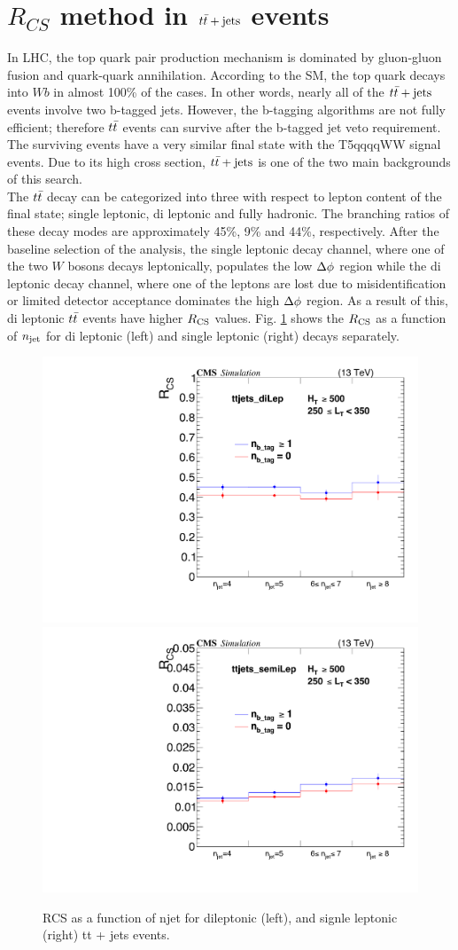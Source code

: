 \section{$R_{CS}$ method in $t\bar{t}+\textrm{jets}$ events}
\label{sec:RcsTT}
In LHC, the top quark pair production mechanism is dominated by gluon-gluon fusion and quark-quark annihilation. According to the SM, the top quark decays into $Wb$ in almost 100\% of the cases.  In other words, nearly all of the $t\bar{t}+\textrm{jets}$ events involve two b-tagged jets. However, the b-tagging algorithms are not fully efficient; therefore $t\bar{t}$ events can survive after the b-tagged jet veto requirement. The surviving events have a very similar final state with the T5qqqqWW signal events. Due to its high cross section,  $t\bar{t}+\textrm{jets}$ is one of the two main backgrounds of this search. \\
The $t\bar{t}$ decay can be categorized into three with respect to lepton content of the final state; single leptonic, di leptonic and fully hadronic. The branching ratios of these decay modes are approximately 45\%, 9\% and 44\%, respectively.  After the baseline selection of the analysis, the single leptonic decay channel, where one of the two $W$ bosons decays leptonically, populates the low $\Delta \phi$ region while the di leptonic decay channel, where one of the leptons are lost due to misidentification or limited detector acceptance dominates the high $\Delta \phi$ region. As a result of this, di leptonic $t\bar{t}$ events have higher $R_{\rm CS}$ values. Fig. \ref{rcsMCtt}  shows the $R_{\rm CS}$ as a function of $n_{\rm jet}$ for di leptonic (left) and single leptonic (right) decays separately.
\begin{figure}[!hbt]
    \begin{center}
 \includegraphics[width=0.45 \textwidth]{Plots/analysis/RCS/dilep}
    \includegraphics[width=0.45 \textwidth]{Plots/analysis/RCS/semilep}
  \caption{ \label{rcsMCtt}  RCS as a function of njet for dileptonic (left), and signle leptonic (right) tt + jets events. }
  \end{center}
\end{figure}
